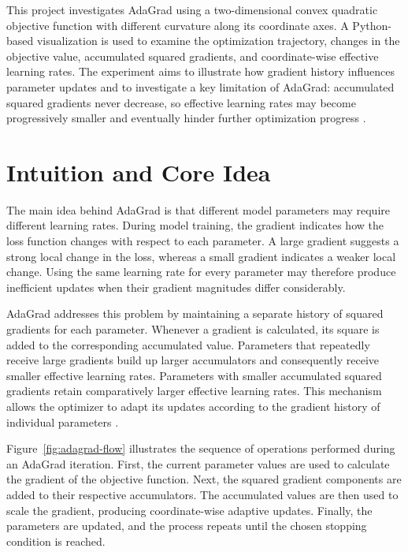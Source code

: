\documentclass[11pt,a4paper]{article}
\begin{document}
This project investigates AdaGrad using a two-dimensional convex quadratic objective function with different curvature along its coordinate axes. A Python-based visualization is used to examine the optimization trajectory, changes in the objective value, accumulated squared gradients, and coordinate-wise effective learning rates. The experiment aims to illustrate how gradient history influences parameter updates and to investigate a key limitation of AdaGrad: accumulated squared gradients never decrease, so effective learning rates may become progressively smaller and eventually hinder further optimization progress \cite{mcmahan2017}.

\section{Intuition and Core Idea}

The main idea behind AdaGrad is that different model parameters may require different learning rates. During model training, the gradient indicates how the loss function changes with respect to each parameter. A large gradient suggests a strong local change in the loss, whereas a small gradient indicates a weaker local change. Using the same learning rate for every parameter may therefore produce inefficient updates when their gradient magnitudes differ considerably.

AdaGrad addresses this problem by maintaining a separate history of squared gradients for each parameter. Whenever a gradient is calculated, its square is added to the corresponding accumulated value. Parameters that repeatedly receive large gradients build up larger accumulators and consequently receive smaller effective learning rates. Parameters with smaller accumulated squared gradients retain comparatively larger effective learning rates. This mechanism allows the optimizer to adapt its updates according to the gradient history of individual parameters \cite{duchi2011}.

Figure~\ref{fig:adagrad-flow}  illustrates the sequence of operations performed during an AdaGrad iteration. First, the current parameter values are used to calculate the gradient of the objective function. Next, the squared gradient components are added to their respective accumulators. The accumulated values are then used to scale the gradient, producing coordinate-wise adaptive updates. Finally, the parameters are updated, and the process repeats until the chosen stopping condition is reached.
\end{document}
